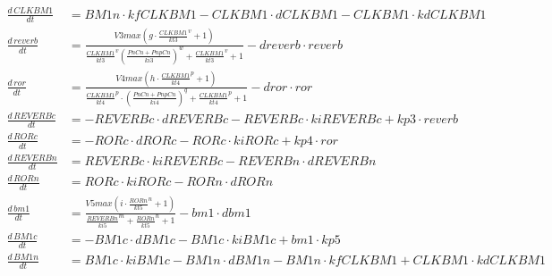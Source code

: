 \begin{table}[p]
  \centering
  \label{tab:relogioeqs}
  \fontsize{9}{11}

  \begin{align*}
    \frac{d\,\mathit{CLKBM1}}{dt} &= \mathit{BM1n} \cdot \mathit{kfCLKBM1} - \mathit{CLKBM1} \cdot \mathit{dCLKBM1} - \mathit{CLKBM1} \cdot \mathit{kdCLKBM1}\\
    \frac{d\,\mathit{reverb}}{dt} &= \frac{\mathit{V3max} \left(\mathit{g} \cdot
    {\frac{\mathit{CLKBM1}}{\mathit{kt3}}}^{\mathit{v}} +
  1\right)}{{\frac{\mathit{CLKBM1}}{\mathit{kt3}}}^{\mathit{v}}
  {\left(\frac{\mathit{PnCn} + \mathit{PnpCn}}{\mathit{ki3}}\right)}^{\mathit{w}} +
  {\frac{\mathit{CLKBM1}}{\mathit{kt3}}}^{\mathit{v}} + 1} - \mathit{dreverb}
  \cdot \mathit{reverb}\\
  \frac{d\,\mathit{ror}}{dt} &= \frac{\mathit{V4max} \left(\mathit{h} \cdot {\frac{\mathit{CLKBM1}}{\mathit{kt4}}}^{\mathit{p}} + 1\right)}{{\frac{\mathit{CLKBM1}}{\mathit{kt4}}}^{\mathit{p}} \cdot {(\frac{\mathit{PnCn} + \mathit{PnpCn}}{\mathit{ki4}})}^{\mathit{q}} + {\frac{\mathit{CLKBM1}}{\mathit{kt4}}}^{\mathit{p}} + 1} - \mathit{dror} \cdot \mathit{ror}\\
  \frac{d\,\mathit{REVERBc}}{dt} &= - \mathit{REVERBc} \cdot \mathit{dREVERBc} - \mathit{REVERBc} \cdot \mathit{kiREVERBc} + \mathit{kp3} \cdot \mathit{reverb}\\
  \frac{d\,\mathit{RORc}}{dt} &= - \mathit{RORc} \cdot \mathit{dRORc} - \mathit{RORc} \cdot \mathit{kiRORc} + \mathit{kp4} \cdot \mathit{ror}\\
  \frac{d\,\mathit{REVERBn}}{dt} &= \mathit{REVERBc} \cdot \mathit{kiREVERBc} - \mathit{REVERBn} \cdot \mathit{dREVERBn}\\
  \frac{d\,\mathit{RORn}}{dt} &= \mathit{RORc} \cdot \mathit{kiRORc} - \mathit{RORn} \cdot \mathit{dRORn}\\
  \frac{d\,\mathit{bm1}}{dt} &= \frac{\mathit{V5max} \left(\mathit{i} \cdot {\frac{\mathit{RORn}}{\mathit{kt5}}}^{\mathit{n}} + 1\right)}{{\frac{\mathit{REVERBn}}{\mathit{ki5}}}^{\mathit{m}} + {\frac{\mathit{RORn}}{\mathit{kt5}}}^{\mathit{n}} + 1} - \mathit{bm1} \cdot \mathit{dbm1}\\
  \frac{d\,\mathit{BM1c}}{dt} &= - \mathit{BM1c} \cdot \mathit{dBM1c} - \mathit{BM1c} \cdot \mathit{kiBM1c} + \mathit{bm1} \cdot \mathit{kp5}\\
  \frac{d\,\mathit{BM1n}}{dt} &= \mathit{BM1c} \cdot \mathit{kiBM1c} - \mathit{BM1n} \cdot \mathit{dBM1n} - \mathit{BM1n} \cdot \mathit{kfCLKBM1} + \mathit{CLKBM1} \cdot \mathit{kdCLKBM1}\\

\end{align*}
\end{table}
